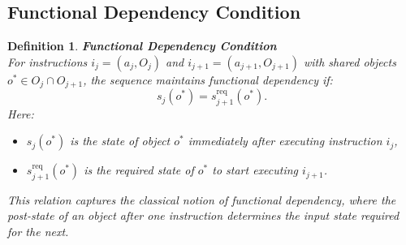 \documentclass[a4paper,11pt]{lmcs}
\newtheorem{definition}{Definition}%
\begin{document}
\subsection{Functional Dependency Condition}
\begin{definition}
\textbf{Functional Dependency Condition} \\
For instructions \( i_j = (a_j, O_j) \) and \( i_{j+1} = (a_{j+1}, O_{j+1}) \) with shared objects \( o^* \in O_j \cap O_{j+1} \), the sequence maintains functional dependency if:
\[
s_j(o^*) = s_{j+1}^{\mathrm{req}}(o^*).
\]
Here:
\begin{itemize}
  \item \( s_j(o^*) \) is the state of object \( o^* \) immediately after executing instruction \( i_j \),
  \item \( s_{j+1}^{\mathrm{req}}(o^*) \) is the required state of \( o^* \) to start executing \( i_{j+1} \).
\end{itemize}
This relation captures the classical notion of functional dependency, where the post-state of an object after one instruction determines the input state required for the next.
\end{definition}
\end{document}
